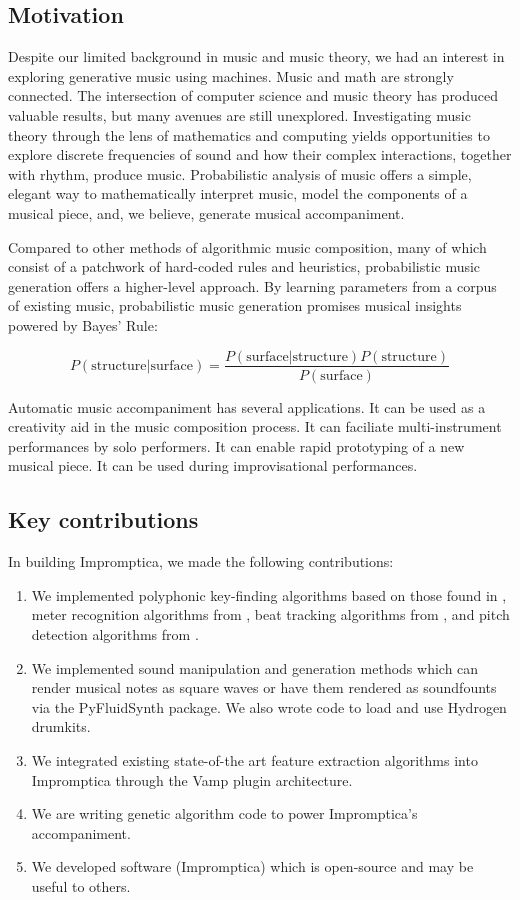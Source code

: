 \documentclass[11pt,conference,letterpaper]{IEEEtran}
\begin{document}
\subsection{Motivation}

Despite our limited background in music and music theory, we had an interest in exploring generative music using machines. Music and math are strongly connected. The intersection of computer science and music theory has produced valuable results, but many avenues are still unexplored. Investigating music theory through the lens of mathematics and computing yields opportunities to explore discrete frequencies of sound and how their complex interactions, together with rhythm, produce music. Probabilistic analysis of music offers a simple, elegant way to mathematically interpret music, model the components of a musical piece, and, we believe, generate musical accompaniment.

Compared to other methods of algorithmic music composition, many of which consist of a patchwork of hard-coded rules and heuristics, probabilistic music generation offers a higher-level approach. By learning parameters from a corpus of existing music, probabilistic music generation promises musical insights powered by Bayes' Rule:

{\small
  \[ P(\text{structure}|\text{surface}) = \frac{P(\text{surface}|\text{structure})P(\text{structure})}{P(\text{surface})} \]
}

Automatic music accompaniment has several applications. It can be used as a creativity aid in the music composition process. It can faciliate multi-instrument performances by solo performers. It can enable rapid prototyping of a new musical piece. It can be used during improvisational performances.

\subsection{Key contributions}

In building Impromptica, we made the following contributions:

\begin{enumerate}
        \item{We implemented polyphonic key-finding algorithms based on those found in \cite{temperly2007mprob}, meter recognition algorithms from \cite{klapuri2006analysis}, beat tracking algorithms from \cite{ellis2007beat}, and pitch detection algorithms from \cite{klapuri2003multiple}.}
        \item{We implemented sound manipulation and generation methods which can render musical notes as square waves or have them rendered as soundfounts via the PyFluidSynth package. We also wrote code to load and use Hydrogen drumkits.}
        \item{We integrated existing state-of-the art feature extraction algorithms into Impromptica through the Vamp plugin architecture.}
        \item{We are writing genetic algorithm code to power Impromptica's accompaniment.}
        \item{We developed software (Impromptica) which is open-source and may be useful to others.}
\end{enumerate}
\end{document}
